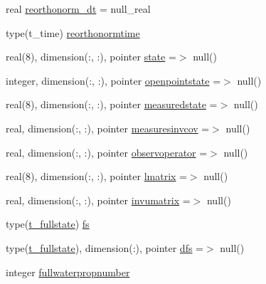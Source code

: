 \begin{DoxyCompactItemize}
\item 
real \mbox{\hyperlink{structmodulesequentialassimilation_1_1t__sequentialassimilation_a3e9b0b72b0bddf302ce00197fca861cb}{reorthonorm\+\_\+dt}} = null\+\_\+real
\item 
type(t\+\_\+time) \mbox{\hyperlink{structmodulesequentialassimilation_1_1t__sequentialassimilation_a3b9ba1fa96b44c41b624590081e915c9}{reorthonormtime}}
\item 
real(8), dimension(\+:, \+:), pointer \mbox{\hyperlink{structmodulesequentialassimilation_1_1t__sequentialassimilation_a93013a6dfc98c6635516495dbe256aae}{state}} =$>$ null()
\item 
integer, dimension(\+:, \+:), pointer \mbox{\hyperlink{structmodulesequentialassimilation_1_1t__sequentialassimilation_a401e25fe4ddf68447e943cfd2d38d658}{openpointstate}} =$>$ null()
\item 
real(8), dimension(\+:, \+:), pointer \mbox{\hyperlink{structmodulesequentialassimilation_1_1t__sequentialassimilation_a3f62175ad47b4c4bb8c14010bdaa4c91}{measuredstate}} =$>$ null()
\item 
real, dimension(\+:, \+:), pointer \mbox{\hyperlink{structmodulesequentialassimilation_1_1t__sequentialassimilation_af95cc939b2bc7f72ccdfb891aaf1d54d}{measuresinvcov}} =$>$ null()
\item 
real, dimension(\+:, \+:), pointer \mbox{\hyperlink{structmodulesequentialassimilation_1_1t__sequentialassimilation_a89dc49ba6208e5106281b52d45107c83}{observoperator}} =$>$ null()
\item 
real(8), dimension(\+:, \+:), pointer \mbox{\hyperlink{structmodulesequentialassimilation_1_1t__sequentialassimilation_a02222b6ca1cc12dcc8e8d9f604000582}{lmatrix}} =$>$ null()
\item 
real, dimension(\+:, \+:), pointer \mbox{\hyperlink{structmodulesequentialassimilation_1_1t__sequentialassimilation_a883975799c59b4c6c1798be416a37bab}{invumatrix}} =$>$ null()
\item 
type(\mbox{\hyperlink{structmodulesequentialassimilation_1_1t__fullstate}{t\+\_\+fullstate}}) \mbox{\hyperlink{structmodulesequentialassimilation_1_1t__sequentialassimilation_ae1e4aba5eb34a197c4a3661aaa5e65cc}{fs}}
\item 
type(\mbox{\hyperlink{structmodulesequentialassimilation_1_1t__fullstate}{t\+\_\+fullstate}}), dimension(\+:), pointer \mbox{\hyperlink{structmodulesequentialassimilation_1_1t__sequentialassimilation_affb77e12642c01bb98f2d1c1d3354f81}{dfs}} =$>$ null()
\item 
integer \mbox{\hyperlink{structmodulesequentialassimilation_1_1t__sequentialassimilation_a5f56e301cd2851450486573bcc239d74}{fullwaterpropnumber}}

\end{DoxyCompactItemize}
